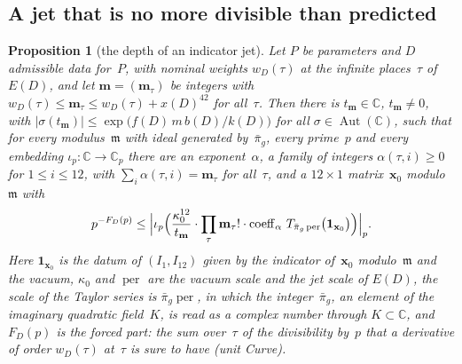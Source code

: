 \documentclass[11pt,a4paper]{article}
\newcommand{\kw}[1]{\emph{#1}}
\newcommand{\m}[1]{\mbox{$#1$}}        %
\theoremstyle{plainx}
\newtheorem{proposition}[theorem]{Proposition}
\theoremstyle{uprightx}
\newcommand{\CC}{\mathbb{C}}
\newcommand{\AutC}{\operatorname{Aut}(\CC)}
\newcommand{\tm}{t_{\mathbf{m}}}              %
\begin{document}
\subsection*{A jet that is no more divisible than predicted}
\begin{proposition}[the depth of an indicator jet]\label{p:depth}
Let $P$ be parameters and $D$ admissible data for~$P$, with nominal weights \m{w_D(\tau)} at the infinite
places~$\tau$ of \m{E(D)}, and let \m{\mathbf{m}=(\mathbf{m}_\tau)} be integers with
\m{w_D(\tau)\le\mathbf{m}_\tau\le w_D(\tau)+x(D)^{42}} for all~$\tau$. Then there is \m{\tm\in\CC}, \m{\tm\ne0}, with
\m{|\sigma(\tm)|\le\exp\bigl(f(D)\,m\,b(D)/k(D)\bigr)} for all \m{\sigma\in\AutC}, such that for every
modulus~$\mathfrak{m}$ with ideal generated by~$\bar\pi_g$, every prime~$p$ and every embedding
\m{\iota_p\colon\CC\to\CC_p} there are an exponent~$\alpha$, a family of integers \m{\alpha(\tau,i)\ge0} for
\m{1\le i\le12}, with \m{\sum_i\alpha(\tau,i)=\mathbf{m}_\tau} for all~$\tau$, and a \m{12\times1} matrix~$\mathbf{x}_0$
modulo~$\mathfrak{m}$ with
\[p^{-F_D(p)}\le\Bigl|\iota_p\Bigl(\frac{\kappa_0^{12}}{\tm}\cdot\prod_\tau\mathbf{m}_\tau!\cdot\operatorname{coeff}_\alpha\,T_{\bar\pi_g\operatorname{per}}\bigl(\mathbf{1}_{\mathbf{x}_0}\bigr)\Bigr)\Bigr|_p .\]
Here \m{\mathbf{1}_{\mathbf{x}_0}} is the datum of \m{(I_1,I_{12})} given by the indicator of~$\mathbf{x}_0$ modulo~$\mathfrak{m}$ and the
vacuum, \m{\kappa_0} and \m{\operatorname{per}} are the vacuum scale and the jet scale of \m{E(D)}, the scale of the Taylor
series is \m{\bar\pi_g\operatorname{per}}, in which the integer~\m{\bar\pi_g}, an element of the imaginary quadratic
field~$K$, is read as a complex number through \m{K\subset\CC}, and \m{F_D(p)} is the \kw{forced part}: the sum
over~$\tau$ of the divisibility by~$p$ that a derivative of order \m{w_D(\tau)} at~$\tau$ is sure to have (unit
\emph{Curve}).
\end{proposition}
\end{document}
